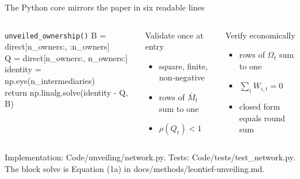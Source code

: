 \documentclass[aspectratio=169,11pt]{beamer}
\newcommand{\source}[1]{%
  \vfill
  {\color{MSSGray}\fontsize{6.5}{7.5}\selectfont #1\par}
}
\begin{document}
\begin{frame}{The Python core mirrors the paper in six readable lines}
  \begin{columns}[T,onlytextwidth]
    \begin{block}{\texttt{unveiled\_ownership()}}
    \ttfamily\fontsize{9.5}{12}\selectfont
    B = direct[n\_owners:, :n\_owners]\\[0.1cm]
    Q = direct[n\_owners:, n\_owners:]\\[0.1cm]
    identity = np.eye(n\_intermediaries)\\[0.25cm]
    return np.linalg.solve(identity - Q, B)
    \end{block}

    \begin{block}{Validate once at entry}
      \begin{itemize}
        \item square, finite, non-negative
        \item rows of \(\bar M_t\) sum to one
        \item \(\rho(Q_t)<1\)
      \end{itemize}
    \end{block}
    \begin{block}{Verify economically}
      \begin{itemize}
        \item rows of \(\Omega_t\) sum to one
        \item \(\sum_iW_{i,t}=0\)
        \item closed form equals round sum
      \end{itemize}
    \end{block}
  \end{columns}
  \source{Implementation: Code/unveiling/network.py. Tests: Code/tests/test\_network.py. The block solve is Equation (1a) in docs/methods/leontief-unveiling.md.}
\end{frame}
\end{document}
